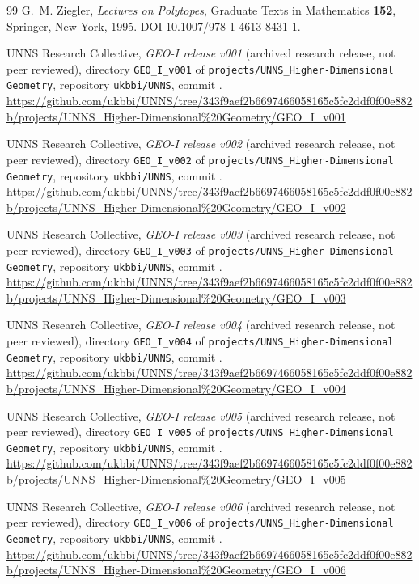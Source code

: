 \begin{thebibliography}{99}
G.~M. Ziegler, \emph{Lectures on Polytopes}, Graduate Texts in Mathematics \textbf{152}, Springer, New York, 1995. DOI 10.1007/978-1-4613-8431-1.

UNNS Research Collective, \emph{GEO-I release v001} (archived research release, not peer reviewed), directory \texttt{GEO\_I\_v001} of \texttt{projects/UNNS\_Higher-Dimensional Geometry}, repository \texttt{ukbbi/UNNS}, commit \geoicommit. \url{https://github.com/ukbbi/UNNS/tree/343f9aef2b6697466058165c5fc2ddf0f00e882b/projects/UNNS_Higher-Dimensional%20Geometry/GEO_I_v001}

UNNS Research Collective, \emph{GEO-I release v002} (archived research release, not peer reviewed), directory \texttt{GEO\_I\_v002} of \texttt{projects/UNNS\_Higher-Dimensional Geometry}, repository \texttt{ukbbi/UNNS}, commit \geoicommit. \url{https://github.com/ukbbi/UNNS/tree/343f9aef2b6697466058165c5fc2ddf0f00e882b/projects/UNNS_Higher-Dimensional%20Geometry/GEO_I_v002}

UNNS Research Collective, \emph{GEO-I release v003} (archived research release, not peer reviewed), directory \texttt{GEO\_I\_v003} of \texttt{projects/UNNS\_Higher-Dimensional Geometry}, repository \texttt{ukbbi/UNNS}, commit \geoicommit. \url{https://github.com/ukbbi/UNNS/tree/343f9aef2b6697466058165c5fc2ddf0f00e882b/projects/UNNS_Higher-Dimensional%20Geometry/GEO_I_v003}

UNNS Research Collective, \emph{GEO-I release v004} (archived research release, not peer reviewed), directory \texttt{GEO\_I\_v004} of \texttt{projects/UNNS\_Higher-Dimensional Geometry}, repository \texttt{ukbbi/UNNS}, commit \geoicommit. \url{https://github.com/ukbbi/UNNS/tree/343f9aef2b6697466058165c5fc2ddf0f00e882b/projects/UNNS_Higher-Dimensional%20Geometry/GEO_I_v004}

UNNS Research Collective, \emph{GEO-I release v005} (archived research release, not peer reviewed), directory \texttt{GEO\_I\_v005} of \texttt{projects/UNNS\_Higher-Dimensional Geometry}, repository \texttt{ukbbi/UNNS}, commit \geoicommit. \url{https://github.com/ukbbi/UNNS/tree/343f9aef2b6697466058165c5fc2ddf0f00e882b/projects/UNNS_Higher-Dimensional%20Geometry/GEO_I_v005}

UNNS Research Collective, \emph{GEO-I release v006} (archived research release, not peer reviewed), directory \texttt{GEO\_I\_v006} of \texttt{projects/UNNS\_Higher-Dimensional Geometry}, repository \texttt{ukbbi/UNNS}, commit \geoicommit. \url{https://github.com/ukbbi/UNNS/tree/343f9aef2b6697466058165c5fc2ddf0f00e882b/projects/UNNS_Higher-Dimensional%20Geometry/GEO_I_v006}


\end{thebibliography}
